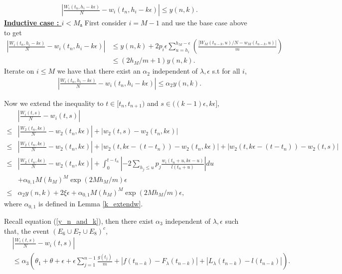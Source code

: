 \documentclass[12pt]{article}
\numberwithin{equation}{section}  %
\begin{document}
\begin{align*} 
 \left|
\frac{W_i(t_n,h_i-k\epsilon)}{N}-w_i(t_n,h_i-k\epsilon)
\right|\leq y(n,k).
\end{align*} 
\noindent\underline{\textbf{Inductive case : $i<M$.}} First consider $i=M-1$ and use the base case above to get
{\footnotesize
\begin{align*} 
 \left|
\frac{W_i(t_n,h_i-k\epsilon)}{N}-w_i(t_n,h_i-k\epsilon)
\right|&\leq y(n,k)+2p_i\epsilon  \sum_{u=h_i}^{h_M-\epsilon} 
\left(
\frac{ |W_M(t_{n-k},u)/N- w_M(t_{n-k},u)|}{m}
\right)\\
&\leq (2h_M/m+1)y(n,k).
\end{align*}} 
Iterate on $i\leq M$ we have that there exist an $\alpha_2$ independent of $\lambda,\epsilon$ s.t for all $i$,
\begin{align} 
 \left|
\frac{W_i(t_n,h_i-k\epsilon)}{N}-w_i(t_n,h_i-k\epsilon)
\right|\leq  \alpha_2 y(n,k). \label{kchoice_temp_W}
\end{align} 

Now we extend the inequality to $t\in [t_n,t_{n+1})$ and $s\in((k-1)\epsilon,k\epsilon]$,
{\footnotesize
\begin{align} 
&\left|\frac{W_i(t,s)}{N}-w_i(t,s) \right|\nonumber\\
\leq& \left|\frac{W_2(t_n,k\epsilon)}{N}-w_2(t_n,k\epsilon) \right|+\left|w_2(t,s)-w_2(t_n,k\epsilon)\right|\nonumber\\
\leq& \left|\frac{W_2(t_n,k\epsilon)}{N}-w_2(t_n,k\epsilon) \right|+\left|w_2(t,k\epsilon-(t-t_n))-w_2(t_n,k\epsilon)\right|+\left|w_2(t,k\epsilon-(t-t_n))-w_2(t,s)\right|\nonumber\\
\leq&\left|\frac{W_2(t_n,k\epsilon)}{N}-w_2(t_n,k\epsilon) \right|+\int_{0}^{t-t_n}\left|-2\sum_{h_j\leq u}p_j\frac{w_i(t_n+u,k\epsilon-u)}{l(t_n+u)}\right|du\nonumber\\
&+\alpha_{0,1}M(h_M)^M\exp(2Mh_M/m)\epsilon \nonumber\\
\leq& \alpha_2 y(n,k)+2\xi\epsilon+\alpha_{0,1}M(h_M)^M\exp(2Mh_M/m)\epsilon\label{kchoice_extend_W},
\end{align} }
where $\alpha_{0,1}$ is defined in Lemma \ref{k_extendw}. 

Recall equation (\ref{y_n_and_k}), then there exist $\alpha_3$ independent of $\lambda, \epsilon$ such that, the event $(E_6\cup E_7\cup E_8)^c$,
\begin{align}
&\left|\frac{W_i(t,s)}{N}-w_i(t,s) \right|\label{k_ew}\\
&\leq \alpha_3\left(
\theta_1+\theta+\epsilon+\epsilon\sum_{j=1}^{n-1} \frac{g(t_{j})}{m} 
+ |f(t_{n-k})-F_\lambda(t_{n-k})| +|L_{\lambda}(t_{n-k})-l(t_{n-k})|
\right)\nonumber.
\end{align}
\end{document}
